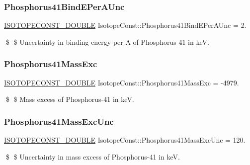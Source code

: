 \subsubsection{\texorpdfstring{Phosphorus41\+Bind\+E\+Per\+A\+Unc}{Phosphorus41BindEPerAUnc}}
{\footnotesize\ttfamily \mbox{\hyperlink{group___isotope_const-_macros_ga8f45a7272ce02c0b4c65c44636ed719a}{I\+S\+O\+T\+O\+P\+E\+C\+O\+N\+S\+T\+\_\+\+D\+O\+U\+B\+LE}} Isotope\+Const\+::\+Phosphorus41\+Bind\+E\+Per\+A\+Unc = 2.}

\$ \$ Uncertainty in binding energy per A of Phosphorus-\/41 in keV. \mbox{\label{group___isotope_const-_phosphorus-_p41_gac799367ed7f92d6c20c0af51537fe917}} 
\subsubsection{\texorpdfstring{Phosphorus41\+Mass\+Exc}{Phosphorus41MassExc}}
{\footnotesize\ttfamily \mbox{\hyperlink{group___isotope_const-_macros_ga8f45a7272ce02c0b4c65c44636ed719a}{I\+S\+O\+T\+O\+P\+E\+C\+O\+N\+S\+T\+\_\+\+D\+O\+U\+B\+LE}} Isotope\+Const\+::\+Phosphorus41\+Mass\+Exc = -\/4979.}

\$ \$ Mass excess of Phosphorus-\/41 in keV. \mbox{\label{group___isotope_const-_phosphorus-_p41_gaffcecf6a4cbb35364c0e909872a55366}} 
\subsubsection{\texorpdfstring{Phosphorus41\+Mass\+Exc\+Unc}{Phosphorus41MassExcUnc}}
{\footnotesize\ttfamily \mbox{\hyperlink{group___isotope_const-_macros_ga8f45a7272ce02c0b4c65c44636ed719a}{I\+S\+O\+T\+O\+P\+E\+C\+O\+N\+S\+T\+\_\+\+D\+O\+U\+B\+LE}} Isotope\+Const\+::\+Phosphorus41\+Mass\+Exc\+Unc = 120.}

\$ \$ Uncertainty in mass excess of Phosphorus-\/41 in keV. \mbox{\label{group___isotope_const-_phosphorus-_p41_ga99e25b1f96d95776a1eab9b57edd54c6}} 
